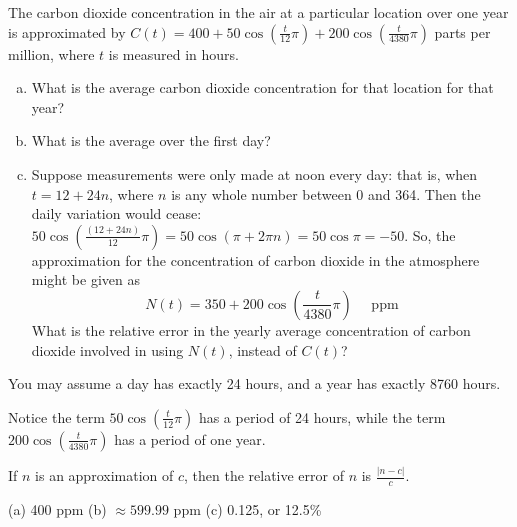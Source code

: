 \begin{Mquestion}
The carbon dioxide concentration in the air at a particular location over one year is approximated by $C(t) = 400+50\cos\left(\frac{t}{12}\pi\right)+200\cos\left(\frac{t}{4380}\pi\right)$ parts per million, where  $t$ is measured in hours.
\begin{enumerate}[(a)]
\item  What is the average carbon dioxide concentration for that location for that year?
\item What is the average over the first day? \item Suppose measurements were only made at noon every day: that is, when $t=12+24n$, where $n$ is any whole number between 0 and 364.
Then the daily variation would cease: $50\cos\left(\frac{(12+24n)}{12}\pi\right) = 50\cos\left(\pi+2\pi n\right) = 50\cos\pi=-50$. So, the approximation for the concentration of carbon dioxide in the atmosphere might be given as
\[N(t) = 350 +200\cos\left(\frac{t}{4380}\pi\right)\quad\text{ ppm}\]
What is the relative error in the yearly average concentration of carbon dioxide involved in using $N(t)$, instead of $C(t)$?
\end{enumerate}
You may assume a day has exactly 24 hours, and a year has exactly 8760 hours.
\end{Mquestion}
\begin{hint}
Notice the term $50\cos\left(\frac{t}{12}\pi\right)$ has a period of 24 hours, while the term
$200\cos\left(\frac{t}{4380}\pi\right)$ has a period of one year.

If $n$ is an approximation of $c$, then the relative error of $n$ is $\frac{|n-c|}{c}$.
\end{hint}
\begin{answer}
(a) 400 ppm \qquad (b) $\approx 599.99$ ppm
\qquad (c) 0.125, or 12.5\%
\end{answer}
